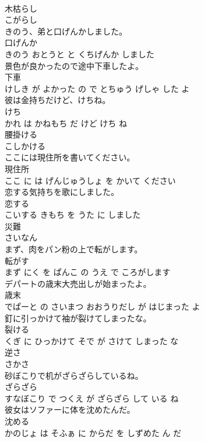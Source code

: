 \documentclass[8pt]{extreport}
\begin{document}
\begin{CJK}{UTF8}{min}
\\	木枯らし	
\\	こがらし			
\\	きのう、弟と口げんかしました。	
\\	口げんか 
\\	きのう おとうと と くちげんか しました			
\\	景色が良かったので途中下車したよ。	
\\	下車 
\\	けしき が よかった の で とちゅう げしゃ した よ			
\\	彼は金持ちだけど、けちね。	
\\	けち 
\\	かれ は かねもち だ けど けち ね			
\\	腰掛ける	
\\	こしかける			
\\	ここには現住所を書いてください。	
\\	現住所 
\\	ここ に は げんじゅうしょ を かいて ください			
\\	恋する気持ちを歌にしました。	
\\	恋する 
\\	こいする きもち を うた に しました			
\\	災難	
\\	さいなん			
\\	まず、肉をパン粉の上で転がします。	
\\	転がす 
\\	まず にく を ぱんこ の うえ で ころがします			
\\	デパートの歳末大売出しが始まったよ。	
\\	歳末 
\\	でぱーと の さいまつ おおうりだし が はじまった よ			
\\	釘に引っかけて袖が裂けてしまったな。	
\\	裂ける 
\\	くぎ に ひっかけて そで が さけて しまった な			
\\	逆さ	
\\	さかさ			
\\	砂ぼこりで机がざらざらしているね。	
\\	ざらざら 
\\	すなぼこり で つくえ が ざらざら して いる ね			
\\	彼女はソファーに体を沈めたんだ。	
\\	沈める 
\\	かのじょ は そふぁ に からだ を しずめた ん だ			

\end{CJK}
\end{document}
